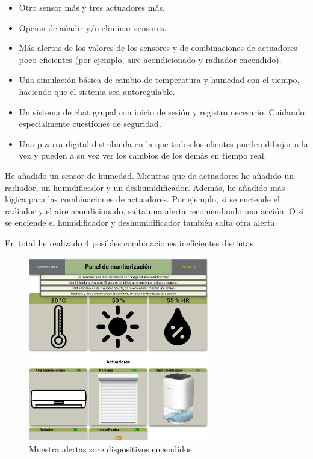 \documentclass{article}
\begin{document}
\begin{itemize}
    \item Otro sensor más y tres actuadores más.
    \item Opcion de añadir y/o eliminar sensores.
    \item Más alertas de los valores de los sensores y de combinaciones de actuadores poco eficientes (por ejemplo, aire acondicionado y radiador encendido).
    \item Una simulación básica de cambio de temperatura y humedad con el tiempo, haciendo que el sistema sea autoregulable.
    \item Un sistema de chat grupal con inicio de sesión y registro necesario. Cuidando especialmente cuestiones de seguridad.
    \item Una pizarra digital distribuida en la que todos los clientes pueden dibujar a la vez y pueden a su vez ver los cambios de los demás en tiempo real.
\end{itemize}

He añadido un sensor de humedad. Mientras que de actuadores he añadido un radiador, un humidificador y un deshumidificador. Además, he añadido más lógica para las combinaciones de actuadores. Por ejemplo, si se enciende el radiador y el aire acondicionado, salta una alerta recomendando una acción. O si se enciende el humidificador y deshumidificador también salta otra alerta.

En total he realizado 4 posibles combinaciones ineficientes distintas.

\begin{figure}[H]
    \centering
    \includegraphics[width=0.7\textwidth]{images/actuadoresmal.png}
    \caption{Muestra alertas sore dispositivos encendidos.}
\end{figure}
\end{document}
